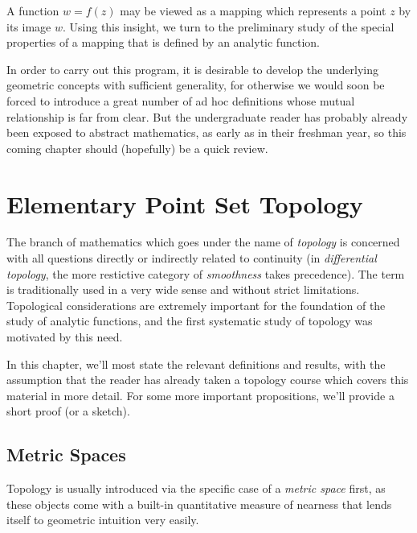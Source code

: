 A function $w=f(z)$ may be viewed as a mapping which represents a point $z$ by its image $w$. Using this insight, we turn to the preliminary study of the special properties of a mapping that is defined by an analytic function.

In order to carry out this program, it is desirable to develop the underlying geometric concepts with sufficient generality, for otherwise we would soon be forced to introduce a great number of ad hoc definitions whose mutual relationship is far from clear. But the undergraduate reader has probably already been exposed to abstract mathematics, as early as in their freshman year, so this coming chapter should (hopefully) be a quick review.

\chapter{Elementary Point Set Topology}
\label{chap:topology}
The branch of mathematics which goes under the name of \emph{topology} is concerned with all questions directly or indirectly related to continuity (in \emph{differential topology}, the more restictive category of \emph{smoothness} takes precedence). The term is traditionally used in a very wide sense and without strict limitations. Topological considerations are extremely important for the foundation of the study of analytic functions, and the first systematic study of topology was motivated by this need.

In this chapter, we'll most state the relevant definitions and results, with the assumption that the reader has already taken a topology course which covers this material in more detail. For some more important propositions, we'll provide a short proof (or a sketch).

\section{Metric Spaces}
Topology is usually introduced via the specific case of a \emph{metric space} first, as these objects come with a built-in quantitative measure of nearness that lends itself to geometric intuition very easily.

